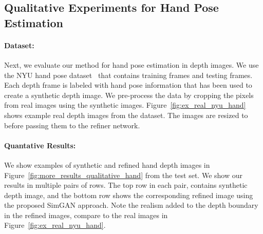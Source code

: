 \documentclass[10pt,twocolumn,letterpaper]{article}
\begin{document}
\subsection*{Qualitative Experiments for Hand Pose Estimation}
\paragraph{Dataset:} Next, we evaluate our method for hand pose estimation in depth images. 
We use the NYU hand pose dataset~\cite{tompson14NYU} that contains  training frames and  testing frames.
Each depth frame is labeled with hand pose information that has been used to create a synthetic depth image. 
We pre-process the data by cropping the pixels from real images using the synthetic images. 
Figure~\ref{fig:ex_real_nyu_hand} shows example real depth images from the dataset. 
The images are resized to  before passing them to the refiner network.


\paragraph{Quantative Results:} We show examples of synthetic and refined hand depth images in Figure~\ref{fig:more_results_qualitative_hand} from the test set. We show our results in multiple pairs of rows. The top row in each pair, contains synthetic depth image, and the bottom row shows the corresponding refined image using the proposed SimGAN approach. Note the realism added to the depth boundary in the refined images, compare to the real images in Figure~\ref{fig:ex_real_nyu_hand}.
\end{document}
